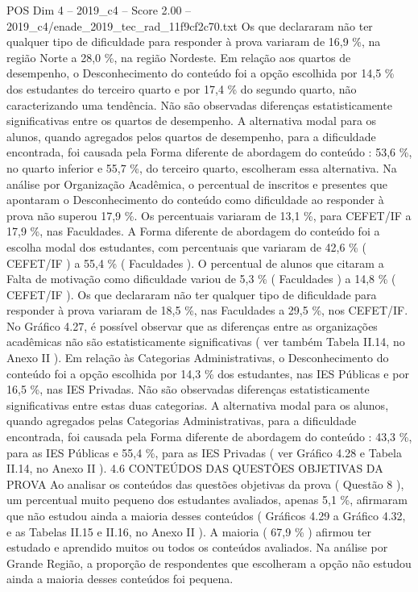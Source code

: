 \begin{textsample}{POS Dim 4 – 2019\_c4 – Score 2.00 – 2019\_c4/enade\_2019\_tec\_rad\_11f9cf2c70.txt}
Os que declararam não ter qualquer tipo de dificuldade para responder à prova variaram de 16,9 \%, na região Norte a 28,0 \%, na região Nordeste.
Em relação aos quartos de desempenho, o Desconhecimento do conteúdo foi a opção escolhida por 14,5 \% dos estudantes do terceiro quarto e por 17,4 \% do segundo quarto, não caracterizando uma tendência.
Não são observadas diferenças estatisticamente significativas entre os quartos de desempenho.
A alternativa modal para os alunos, quando agregados pelos quartos de desempenho, para a dificuldade encontrada, foi causada pela Forma diferente de abordagem do conteúdo : 53,6 \%, no quarto inferior e 55,7 \%, do terceiro quarto, escolheram essa alternativa.
Na análise por Organização Acadêmica, o percentual de inscritos e presentes que apontaram o Desconhecimento do conteúdo como dificuldade ao responder à prova não superou 17,9 \%.
Os percentuais variaram de 13,1 \%, para CEFET/IF a 17,9 \%, nas Faculdades.
A Forma diferente de abordagem do conteúdo foi a escolha modal dos estudantes, com percentuais que variaram de 42,6 \% ( CEFET/IF ) a 55,4 \% ( Faculdades ).
O percentual de alunos que citaram a Falta de motivação como dificuldade variou de 5,3 \% ( Faculdades ) a 14,8 \% ( CEFET/IF ).
Os que declararam não ter qualquer tipo de dificuldade para responder à prova variaram de 18,5 \%, nas Faculdades a 29,5 \%, nos CEFET/IF.
No Gráfico 4.27, é possível observar que as diferenças entre as organizações acadêmicas não são estatisticamente significativas ( ver também Tabela II.14, no Anexo II ).
Em relação às Categorias Administrativas, o Desconhecimento do conteúdo foi a opção escolhida por 14,3 \% dos estudantes, nas IES Públicas e por 16,5 \%, nas IES Privadas.
Não são observadas diferenças estatisticamente significativas entre estas duas categorias.
A alternativa modal para os alunos, quando agregados pelas Categorias Administrativas, para a dificuldade encontrada, foi causada pela Forma diferente de abordagem do conteúdo : 43,3 \%, para as IES Públicas e 55,4 \%, para as IES Privadas ( ver Gráfico 4.28 e Tabela II.14, no Anexo II ). 4.6 CONTEÚDOS DAS QUESTÕES OBJETIVAS DA PROVA Ao analisar os conteúdos das questões objetivas da prova ( Questão 8 ), um percentual muito pequeno dos estudantes avaliados, apenas 5,1 \%, afirmaram que não estudou ainda a maioria desses conteúdos ( Gráficos 4.29 a Gráfico 4.32, e as Tabelas II.15 e II.16, no Anexo II ).
A maioria ( 67,9 \% ) afirmou ter estudado e aprendido muitos ou todos os conteúdos avaliados.
Na análise por Grande Região, a proporção de respondentes que escolheram a opção não estudou ainda a maioria desses conteúdos foi pequena.

\end{textsample}
